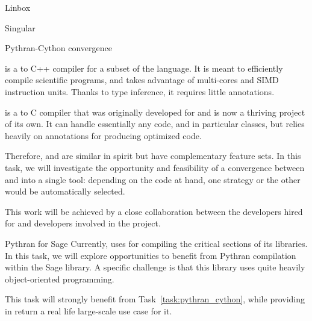 \begin{Workpackage}{\thewpno}
\begin{task}{Linbox}
  \label{task:hpc_linbox}
\end{task}

\begin{task}{Singular}
  \label{task:hpc_singular}
\end{task}


\begin{task}{Pythran-Cython convergence}
  \label{task:pythran_cython}

  \Pythran is a \Python to C++ compiler for a subset of the \Python
  language. It is meant to efficiently compile scientific programs,
  and takes advantage of multi-cores and SIMD instruction units.
  Thanks to type inference, it requires little annotations.

  \Cython is a \Python to C compiler that was originally developed for
  \Sage and is now a thriving project of its own. It can handle
  essentially any \Python code, and in particular classes, but relies
  heavily on annotations for producing optimized code.

  Therefore, \Pythran and \Cython are similar in spirit but have
  complementary feature sets. In this task, we will investigate the
  opportunity and feasibility of a convergence between \Cython and
  \Pythran into a single tool: depending on the code at hand, one
  strategy or the other would be automatically selected.

  This work will be achieved by a close collaboration between the
  \Pythran developers hired for \TheProject and \Cython developers
  involved in the \Sage project.


\end{task}

\begin{task}{Pythran for Sage}
  \label{task:pythran_sage}
  Currently, \Sage uses \Cython for compiling the critical sections of
  its libraries. In this task, we will explore opportunities to
  benefit from Pythran compilation within the Sage library. A specific
  challenge is that this library uses quite heavily object-oriented
  programming.

  This task will strongly benefit from Task~\ref{task:pythran_cython},
  while providing in return a real life large-scale use case for it.
\end{task}




\begin{WPDeliverables}
\end{WPDeliverables}
\end{Workpackage}

